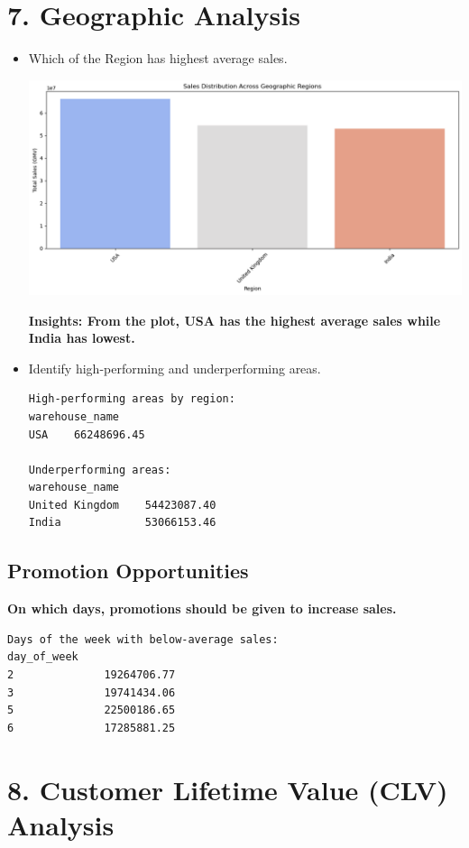 \documentclass{article}
\begin{document}
\section{7. Geographic Analysis}
    \begin{itemize}
        \item Which of the Region has highest average sales.{
             \begin{center}
                \includegraphics[width=1\columnwidth]{images/region.png}
             \end{center}
             \textbf{Insights: From the plot, USA has the highest average sales while India has lowest.}
        }
        \item Identify high-performing and underperforming areas.{
            \begin{verbatim}
High-performing areas by region:
warehouse_name
USA    66248696.45

Underperforming areas:
warehouse_name
United Kingdom    54423087.40
India             53066153.46
            \end{verbatim}
   
        }
    \end{itemize}

    
    \subsection{Promotion Opportunities}
    \textbf{On which days, promotions should be given to increase sales.}
    \begin{verbatim}
Days of the week with below-average sales:
day_of_week
2              19264706.77
3              19741434.06
5              22500186.65
6              17285881.25
    \end{verbatim}



\section{8. Customer Lifetime Value (CLV) Analysis}
\end{document}
